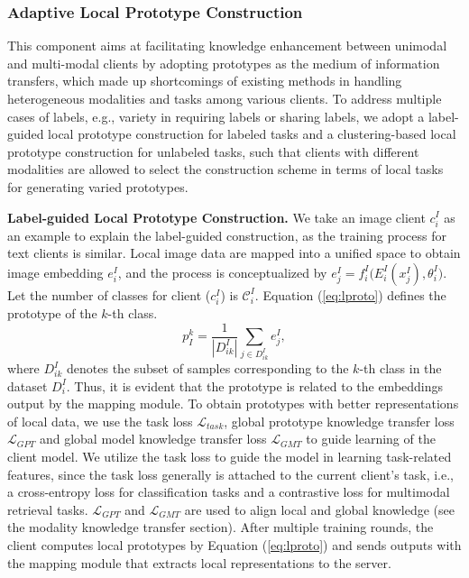 \subsubsection{Adaptive Local Prototype Construction}\label{ada-proto}
This component aims at facilitating knowledge enhancement between unimodal and multi-modal clients by adopting prototypes as the medium of information transfers, which made up shortcomings of existing methods in handling heterogeneous modalities and tasks among various clients. 
To address multiple cases of labels, e.g., variety in requiring labels or sharing labels, we adopt a label-guided local prototype construction for labeled tasks and a clustering-based local prototype construction for unlabeled tasks, such that clients with different modalities are allowed to select the construction scheme in terms of local tasks for generating varied prototypes. 


\noindent\textbf{Label-guided Local Prototype Construction. }\label{sec:slocal}
We take an image client $c_i^I$ as an example to explain the label-guided construction, as the training process for text clients is similar.
Local image data are mapped into a unified space to obtain image embedding $e_i^I$, and the process is conceptualized by $ e_j^I = f_i^I\bigl(E_i^I(x_j^I),\theta_i^I\bigr)$.
Let the number of classes for client ($c_i^I$) is $\mathcal C_i^I$. 
Equation (\ref{eq:lproto}) defines the prototype of the $k$-th class.
\begin{equation}\label{eq:lproto}
    p_I^k = \frac{1}{|D_{ik}^I|}\sum_{j\in D_{ik}^I } e_j^I,
\end{equation}
where $D_{ik}^I$ denotes the subset of samples corresponding to the $k$-th class in the dataset $D_{i}^I$. 
Thus, it is evident that the prototype is related to the embeddings output by the mapping module. 
To obtain prototypes with better representations of local data, we use the task loss $\mathcal L_{task}$, global prototype knowledge transfer loss $\mathcal L_{GPT}$ and global model knowledge transfer loss $\mathcal L_{GMT}$ to guide learning of the client model.
We utilize the task loss to guide the model in learning task-related features, since the task loss generally is attached to the current client's task, i.e., a cross-entropy loss for classification tasks and a contrastive loss for multimodal retrieval tasks. 
$\mathcal L_{GPT}$ and $\mathcal L_{GMT}$ are used to align local and global knowledge (see the modality knowledge transfer section).
After multiple training rounds, the client computes local prototypes by Equation (\ref{eq:lproto}) and sends outputs with the mapping module that extracts local representations to the server. 




